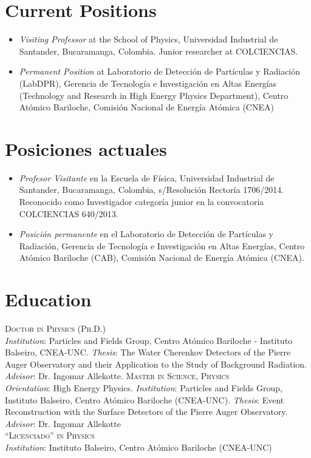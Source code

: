 \ifeng
\section*{Current Positions}
\begin{itemize}
  \item \emph{Visiting Professor} at the School of Physics, Universidad Industrial de Santander, Bucaramanga, Colombia. Junior researcher at COLCIENCIAS.
  \item \emph{Permanent Position} at Laboratorio de Detección de Partículas y Radiación (LabDPR), Gerencia de Tecnología e Investigación en Altas Energías (Technology and Research in High Energy Physics Department), Centro Atómico Bariloche, Comisión Nacional de Energía Atómica (CNEA)
\end{itemize}
\else
\section*{Posiciones actuales}
\begin{itemize}
\item \emph{Profesor Visitante} en la Escuela de Física, Universidad Industrial de Santander, Bucaramanga, Colombia, s/Resolución Rectoría 1706/2014. Reconocido como Investigador categoría junior en la convocatoria COLCIENCIAS 640/2013.

\item \emph{Posición permanente} en el Laboratorio de Detección de Partículas y Radiación, Gerencia de Tecnología e Investigación en Altas Energías, Centro Atómico Bariloche (CAB), Comisión Nacional de Energía Atómica (CNEA).\\

\end{itemize}
\fi

\ifeng
\section*{Education}
\noindent
{}\textsc{Doctor in Physics (Ph.D.)}\\
{\emph{Institution}}: Particles and Fields Group, Centro Atómico Bariloche - Instituto Balseiro, CNEA-UNC. {\emph{Thesis}}: The Water Cherenkov Detectors of the Pierre Auger Observatory and their Application to the Study of Background Radiation. {\emph{Advisor}}: Dr. Ingomar Allekotte.
\textsc{Master in Science, Physics}\\
{\emph{Orientation}}: High Energy Physics. {\emph{Institution}}: Particles and Fields Group, Instituto Balseiro, Centro Atómico Bariloche (CNEA-UNC). {\emph{Thesis}}: Event Reconstruction with the Surface Detectors of the Pierre Auger Observatory. {\emph{Advisor}}: Dr. Ingomar Allekotte\\
\textsc{``Licenciado'' in Physics}\\
{\emph{Institution}}: Instituto Balseiro, Centro Atómico Bariloche (CNEA-UNC)\\
\else
